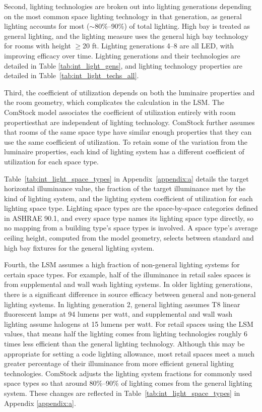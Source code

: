 Second, lighting technologies are broken out into lighting generations depending on the most common space lighting technology in that generation, as general lighting accounts for most ($\sim$80\%--90\%) of total lighting. High bay is treated as general lighting, and the lighting measure uses the general high bay technology for rooms with height $\ge$20 ft. Lighting generations 4--8 are all LED, with improving efficacy over time. Lighting generations and their technologies are detailed in Table \ref{tab:int_light_gens}, and lighting technology properties are detailed in Table~\ref{tab:int_light_techs_all}.

Third, the coefficient of utilization depends on both the luminaire properties and the room geometry, which complicates the calculation in the LSM. The ComStock model associates the coefficient of utilization entirely with room propertiesthat are independent of lighting technology.  ComStock further assumes that rooms of the same space type have similar enough properties that they can use the same coefficient of utilization. To retain some of the variation from the luminaire properties, each kind of lighting system has a different coefficient of utilization for each space type.

Table~\ref{tab:int_light_space_types} in Appendix~\ref{appendix:a} details the target horizontal illuminance value, the fraction of the target illuminance met by the kind of lighting system, and the lighting system coefficient of utilization for each lighting space type. Lighting space types are the space-by-space categories defined in ASHRAE 90.1, and every space type names its lighting space type directly, so no mapping from a building type's space types is involved. A space type's average ceiling height, computed from the model geometry, selects between standard and high bay fixtures for the general lighting system.

Fourth, the LSM assumes a high fraction of non-general lighting systems for certain space types. For example, half of the illuminance in retail sales spaces is from supplemental and wall wash lighting systems. In older lighting generations, there is a significant difference in source efficacy between general and non-general lighting systems. In lighting generation 2, general lighting assumes T8 linear fluorescent lamps at 94 lumens per watt, and supplemental and wall wash lighting assume halogens at 15 lumens per watt.  For retail spaces using the LSM values, that means half the lighting comes from lighting technologies roughly 6 times less efficient than the general lighting technology.  Although this may be appropriate for setting a code lighting allowance, most retail spaces meet a much greater percentage of their illuminance from more efficient general lighting technologies.  ComStock adjusts the lighting system fractions for commonly used space types so that around 80\%--90\% of lighting comes from the general lighting system. These changes are reflected in Table~\ref{tab:int_light_space_types} in Appendix \ref{appendix:a}.

